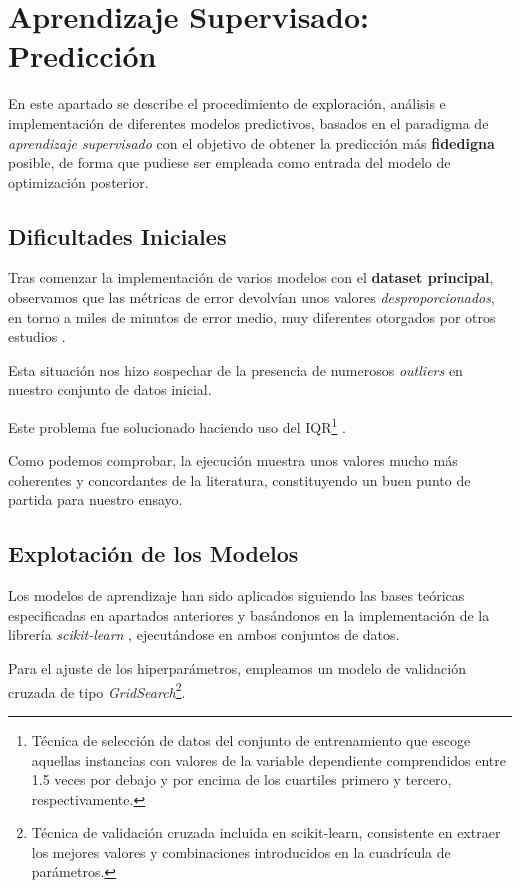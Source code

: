 \newpage

\section{Aprendizaje Supervisado: Predicción}

En este apartado se describe el procedimiento de exploración, análisis e implementación de diferentes modelos predictivos, basados en el paradigma de \textit{aprendizaje supervisado} con el objetivo de obtener la predicción más \textbf{fidedigna} posible, de forma que pudiese ser empleada como entrada del modelo de optimización posterior.

\subsection{Dificultades Iniciales}

Tras comenzar la implementación de varios modelos con el \textbf{dataset principal}, observamos que las métricas de error devolvían unos valores \textit{desproporcionados}, en torno a miles de minutos de error medio, muy diferentes  otorgados por otros estudios \cite{ShahabiKargar2014PredictingSurgery}.

Esta situación nos hizo sospechar de la presencia de numerosos \textit{outliers} en nuestro conjunto de datos inicial. 

Este problema fue solucionado haciendo uso del IQR\footnote{Técnica de selección de datos del conjunto de entrenamiento que escoge aquellas instancias con valores de la variable dependiente comprendidos entre 1.5 veces por debajo y por encima de los cuartiles primero y tercero, respectivamente.} \cite{Bonthu2021DetectingOutliers}.

Como podemos comprobar, la ejecución muestra unos valores mucho más coherentes y concordantes de la literatura, constituyendo un buen punto de partida para nuestro ensayo.

\subsection{Explotación de los Modelos}

Los modelos de aprendizaje han sido aplicados siguiendo las bases teóricas especificadas en apartados anteriores y basándonos en la implementación de la librería \textit{scikit-learn} \cite{2021Scikit-LearnPython}, ejecutándose en ambos conjuntos de datos.

Para el ajuste de los hiperparámetros, empleamos un modelo de validación cruzada de tipo \textit{GridSearch}\footnote{Técnica de validación cruzada incluida en scikit-learn, consistente en extraer los mejores valores y combinaciones introducidos en la cuadrícula de parámetros.}.

